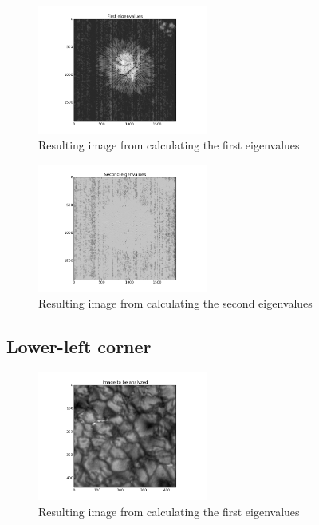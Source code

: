 \documentclass{article}
\begin{document}
\begin{figure}[H]
    \centering
    \includegraphics[width=0.5\textwidth]{full/first}
    \caption{Resulting image from calculating the first eigenvalues}
    \label{average}
\end{figure}

\begin{figure}[H]
    \centering
    \includegraphics[width=0.5\textwidth]{full/second}
    \caption{Resulting image from calculating the second eigenvalues}
    \label{average}
\end{figure}

\subsection{Lower-left corner}

\begin{figure}[H]
    \centering
    \includegraphics[width=0.5\textwidth]{esqinf/analyzed}
    \caption{Resulting image from calculating the first eigenvalues}
    \label{average}
\end{figure}
\end{document}
